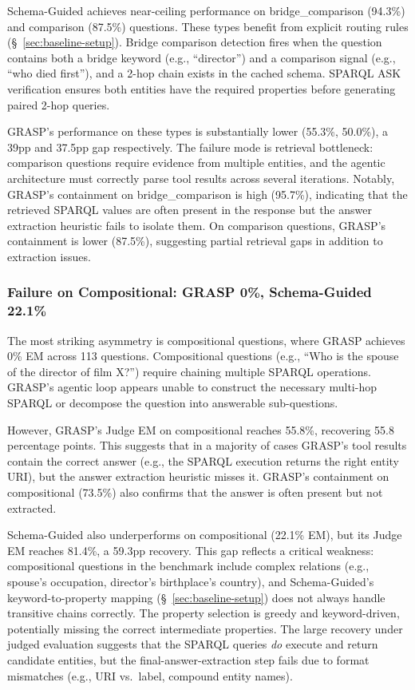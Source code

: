 Schema-Guided achieves near-ceiling performance on bridge\_comparison (94.3\%) and comparison (87.5\%) questions. These types benefit from explicit routing rules (\S~\ref{sec:baseline-setup}). Bridge comparison detection fires when the question contains both a bridge keyword (e.g., ``director'') and a comparison signal (e.g., ``who died first''), and a 2-hop chain exists in the cached schema. SPARQL ASK verification ensures both entities have the required properties before generating paired 2-hop queries.

GRASP's performance on these types is substantially lower (55.3\%, 50.0\%), a 39pp and 37.5pp gap respectively. The failure mode is retrieval bottleneck: comparison questions require evidence from multiple entities, and the agentic architecture must correctly parse tool results across several iterations. Notably, GRASP's containment on bridge\_comparison is high (95.7\%), indicating that the retrieved SPARQL values are often present in the response but the answer extraction heuristic fails to isolate them. On comparison questions, GRASP's containment is lower (87.5\%), suggesting partial retrieval gaps in addition to extraction issues.

\subsubsection{Failure on Compositional: GRASP 0\%, Schema-Guided 22.1\%}

The most striking asymmetry is compositional questions, where GRASP achieves 0\% EM across 113 questions. Compositional questions (e.g., ``Who is the spouse of the director of film X?'') require chaining multiple SPARQL operations. GRASP's agentic loop appears unable to construct the necessary multi-hop SPARQL or decompose the question into answerable sub-questions.

However, GRASP's Judge EM on compositional reaches 55.8\%, recovering 55.8 percentage points. This suggests that in a majority of cases GRASP's tool results contain the correct answer (e.g., the SPARQL execution returns the right entity URI), but the answer extraction heuristic misses it. GRASP's containment on compositional (73.5\%) also confirms that the answer is often present but not extracted.

Schema-Guided also underperforms on compositional (22.1\% EM), but its Judge EM reaches 81.4\%, a 59.3pp recovery. This gap reflects a critical weakness: compositional questions in the benchmark include complex relations (e.g., spouse's occupation, director's birthplace's country), and Schema-Guided's keyword-to-property mapping (\S~\ref{sec:baseline-setup}) does not always handle transitive chains correctly. The property selection is greedy and keyword-driven, potentially missing the correct intermediate properties. The large recovery under judged evaluation suggests that the SPARQL queries \textit{do} execute and return candidate entities, but the final-answer-extraction step fails due to format mismatches (e.g., URI vs.\ label, compound entity names).

